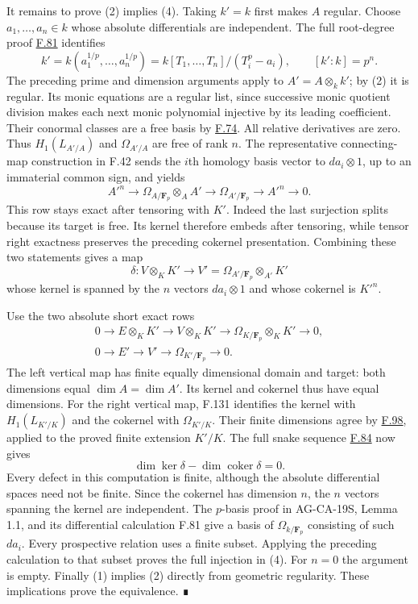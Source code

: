 \documentclass[11pt,a4paper,openany]{report}
\begin{document}
It remains to prove (2) implies (4). Taking \(k'=k\) first makes \(A\) regular. Choose \(a_1,\ldots,a_n\in k\) whose absolute differentials are independent. The full root-degree proof \hyperref[AG-RG-S05-algebra-lemma-size-extension-pth-roots]{F.81} identifies \[k'=k(a_1^{1/p},\ldots,a_n^{1/p})=k[T_1,\ldots,T_n]/(T_i^p-a_i),\qquad [k':k]=p^n.\] The preceding prime and dimension arguments apply to \(A'=A\otimes_k k'\); by (2) it is regular. Its monic equations are a regular list, since successive monic quotient division makes each next monic polynomial injective by its leading coefficient. Their conormal classes are a free basis by \hyperref[AG-RG-S05-algebra-lemma-regular-quasi-regular]{F.74}. All relative derivatives are zero. Thus \(H_1(L_{A'/A})\) and \(\Omega_{A'/A}\) are free of rank \(n\). The representative connecting-map construction in F.42 sends the \(i\)th homology basis vector to \(da_i\otimes1\), up to an immaterial common sign, and yields \[A'^n\to\Omega_{A/\mathbf F_p}\otimes_A A'\to\Omega_{A'/\mathbf F_p}\to A'^n\to0.\] This row stays exact after tensoring with \(K'\). Indeed the last surjection splits because its target is free. Its kernel therefore embeds after tensoring, while tensor right exactness preserves the preceding cokernel presentation. Combining these two statements gives a map \[\delta:V\otimes_K K'\longrightarrow V'=\Omega_{A'/\mathbf F_p}\otimes_{A'}K'\] whose kernel is spanned by the \(n\) vectors \(da_i\otimes1\) and whose cokernel is \(K'^n\).

Use the two absolute short exact rows \[\begin{gathered}
0\to E\otimes_K K'\to V\otimes_K K'\to\Omega_{K/\mathbf F_p}\otimes_K K'\to0,\\
0\to E'\to V'\to\Omega_{K'/\mathbf F_p}\to0.
\end{gathered}\] The left vertical map has finite equally dimensional domain and target: both dimensions equal \(\dim A=\dim A'\). Its kernel and cokernel thus have equal dimensions. For the right vertical map, F.131 identifies the kernel with \(H_1(L_{K'/K})\) and the cokernel with \(\Omega_{K'/K}\). Their finite dimensions agree by \hyperref[AG-RG-S05-more-algebra-lemma-cartier-equality]{F.98}, applied to the proved finite extension \(K'/K\). The full snake sequence \hyperref[AG-RG-S05-algebra-lemma-snake]{F.84} now gives \[\dim\ker\delta-\dim\operatorname{coker}\delta=0.\] Every defect in this computation is finite, although the absolute differential spaces need not be finite. Since the cokernel has dimension \(n\), the \(n\) vectors spanning the kernel are independent. The \(p\)-basis proof in AG-CA-19S, Lemma 1.1, and its differential calculation F.81 give a basis of \(\Omega_{k/\mathbf F_p}\) consisting of such \(da_i\). Every prospective relation uses a finite subset. Applying the preceding calculation to that subset proves the full injection in (4). For \(n=0\) the argument is empty. Finally (1) implies (2) directly from geometric regularity. These implications prove the equivalence. ∎
\end{document}
